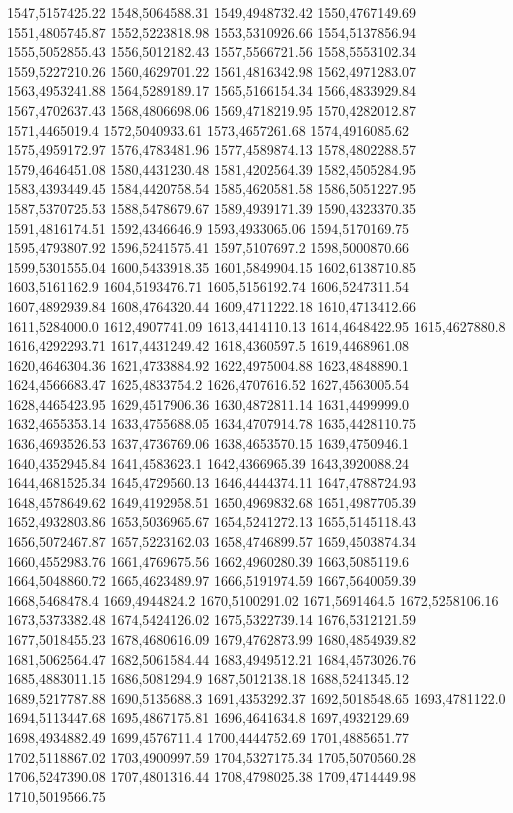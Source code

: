 1547,5157425.22
1548,5064588.31
1549,4948732.42
1550,4767149.69
1551,4805745.87
1552,5223818.98
1553,5310926.66
1554,5137856.94
1555,5052855.43
1556,5012182.43
1557,5566721.56
1558,5553102.34
1559,5227210.26
1560,4629701.22
1561,4816342.98
1562,4971283.07
1563,4953241.88
1564,5289189.17
1565,5166154.34
1566,4833929.84
1567,4702637.43
1568,4806698.06
1569,4718219.95
1570,4282012.87
1571,4465019.4
1572,5040933.61
1573,4657261.68
1574,4916085.62
1575,4959172.97
1576,4783481.96
1577,4589874.13
1578,4802288.57
1579,4646451.08
1580,4431230.48
1581,4202564.39
1582,4505284.95
1583,4393449.45
1584,4420758.54
1585,4620581.58
1586,5051227.95
1587,5370725.53
1588,5478679.67
1589,4939171.39
1590,4323370.35
1591,4816174.51
1592,4346646.9
1593,4933065.06
1594,5170169.75
1595,4793807.92
1596,5241575.41
1597,5107697.2
1598,5000870.66
1599,5301555.04
1600,5433918.35
1601,5849904.15
1602,6138710.85
1603,5161162.9
1604,5193476.71
1605,5156192.74
1606,5247311.54
1607,4892939.84
1608,4764320.44
1609,4711222.18
1610,4713412.66
1611,5284000.0
1612,4907741.09
1613,4414110.13
1614,4648422.95
1615,4627880.8
1616,4292293.71
1617,4431249.42
1618,4360597.5
1619,4468961.08
1620,4646304.36
1621,4733884.92
1622,4975004.88
1623,4848890.1
1624,4566683.47
1625,4833754.2
1626,4707616.52
1627,4563005.54
1628,4465423.95
1629,4517906.36
1630,4872811.14
1631,4499999.0
1632,4655353.14
1633,4755688.05
1634,4707914.78
1635,4428110.75
1636,4693526.53
1637,4736769.06
1638,4653570.15
1639,4750946.1
1640,4352945.84
1641,4583623.1
1642,4366965.39
1643,3920088.24
1644,4681525.34
1645,4729560.13
1646,4444374.11
1647,4788724.93
1648,4578649.62
1649,4192958.51
1650,4969832.68
1651,4987705.39
1652,4932803.86
1653,5036965.67
1654,5241272.13
1655,5145118.43
1656,5072467.87
1657,5223162.03
1658,4746899.57
1659,4503874.34
1660,4552983.76
1661,4769675.56
1662,4960280.39
1663,5085119.6
1664,5048860.72
1665,4623489.97
1666,5191974.59
1667,5640059.39
1668,5468478.4
1669,4944824.2
1670,5100291.02
1671,5691464.5
1672,5258106.16
1673,5373382.48
1674,5424126.02
1675,5322739.14
1676,5312121.59
1677,5018455.23
1678,4680616.09
1679,4762873.99
1680,4854939.82
1681,5062564.47
1682,5061584.44
1683,4949512.21
1684,4573026.76
1685,4883011.15
1686,5081294.9
1687,5012138.18
1688,5241345.12
1689,5217787.88
1690,5135688.3
1691,4353292.37
1692,5018548.65
1693,4781122.0
1694,5113447.68
1695,4867175.81
1696,4641634.8
1697,4932129.69
1698,4934882.49
1699,4576711.4
1700,4444752.69
1701,4885651.77
1702,5118867.02
1703,4900997.59
1704,5327175.34
1705,5070560.28
1706,5247390.08
1707,4801316.44
1708,4798025.38
1709,4714449.98
1710,5019566.75
